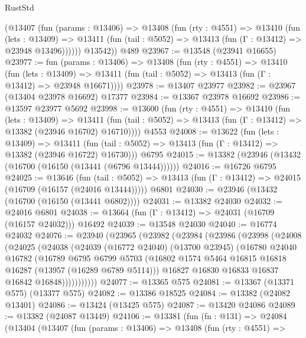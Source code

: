 \begin{lexlean}{RustStd}
\begin{coremodule}
        (@13407
          (fun (params : @13406) =>
          @13408
            (fun (rty : @4551) =>
            @13410
              (fun (lets : @13409) =>
              @13411 (fun (tail : @5052) => @13413 (fun (Γ : @13412) => @23948 @13496))))))
        @13542))
    @489
@23967 := @13548 (@23941 @16655)
@23977 := fun (params : @13406) =>
  @13408
    (fun (rty : @4551) =>
    @13410
      (fun (lets : @13409) =>
      @13411 (fun (tail : @5052) => @13413 (fun (Γ : @13412) => @23948 @16671))))
@23978 := @13407 @23977
@23982 := @23967 (@13404 @23978 @16692) @17377
@23984 := @13367 @23978 @16692
@23986 := @13597 @23977 @5692
@23998 := @13600
    (fun (rty : @4551) =>
    @13410
      (fun (lets : @13409) =>
      @13411 (fun (tail : @5052) => @13413 (fun (Γ : @13412) => @13382 (@23946 @16702) @16710))))
    @4553
@24008 := @13622
    (fun (lets : @13409) =>
    @13411 (fun (tail : @5052) => @13413 (fun (Γ : @13412) => @13382 (@23946 @16722) @16730)))
    @6795
@24015 := @13382 (@23946 (@13432 (@16700 (@16150 (@13441 (@6796 @13444))))))
@24016 := @16726 @6795
@24025 := @13646
    (fun (tail : @5052) => @13413 (fun (Γ : @13412) => @24015 (@16709 (@16157 (@24016 @13444)))))
    @6801
@24030 := @23946 (@13432 (@16700 (@16150 (@13441 @6802))))
@24031 := @13382 @24030
@24032 := @24016 @6801
@24038 := @13664 (fun (Γ : @13412) => @24031 (@16709 (@16157 @24032))) @16492
@24039 := @13548 @24030
@24040 := @16774 @24032
@24076 := @23940
    (@23965
      (@23982
        (@23984
          (@23986
            (@23998
              (@24008
                (@24025
                  (@24038
                    (@24039
                      (@16772 @24040)
                      (@13700 @23945)
                      (@16780
                        @24040
                        @16782
                        (@16789
                          @6795
                          @6799
                          @5703
                          (@16802 @1574 @5464 @16815 @16818 @16287 (@13957 (@16289 @6789 @5114)))
                          @16827
                          @16830
                          @16833
                          @16837
                          @16842
                          @16848)))))))))))
@24077 := @13365 @575
@24081 := @13367 (@13371 @575) (@13377 @575)
@24082 := @13386 @18525
@24084 := @13382 (@24082 @13401)
@24086 := @13424 (@13425 @575)
@24087 := @13420 @24086
@24089 := @13382 (@24087 @13449)
@24106 := @13381
    (fun (fn : @131) =>
    @24084
      (@13404
        (@13407
          (fun (params : @13406) =>
          @13408
            (fun (rty : @4551) =>

\end{coremodule}
\end{lexlean}
